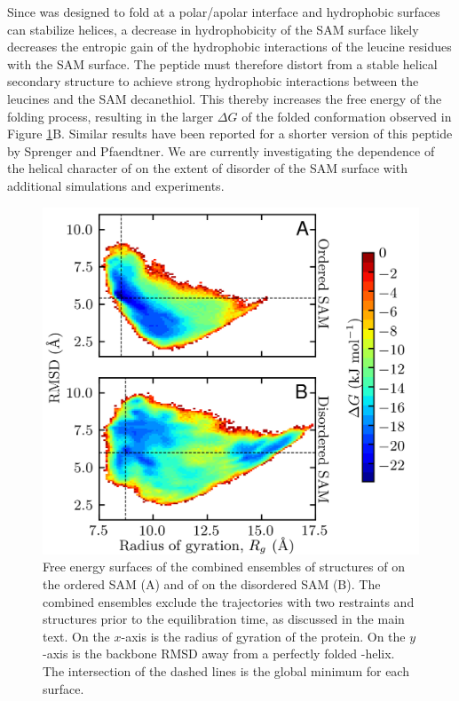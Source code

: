 Since \pep{} was designed to fold at a polar/apolar interface\cite{DeGrado1985} and hydrophobic surfaces can stabilize helices\cite{Levine2016}, a decrease in hydrophobicity of the SAM surface likely decreases the entropic gain of the hydrophobic interactions of the leucine residues with the SAM surface. 
The peptide must therefore distort from a stable helical secondary structure to achieve strong hydrophobic interactions between the leucines and the SAM decanethiol. 
This thereby increases the free energy of the folding process, resulting in the larger $\Delta G$ of the folded conformation observed in Figure \ref{fig:helix-free_order}B. 
Similar results have been reported for a shorter version of this peptide by Sprenger and Pfaendtner\cite{Sprenger2016}. 
We are currently investigating the dependence of the helical character of \pep{} on the extent of disorder of the SAM surface with additional simulations and experiments.  

\begin{figure}
    \center
    \includegraphics[width=\single]{figures-helix/comparison_free_energy_plots.png}
    \caption[Comparison of the free energy surfaces of \pep{} on an ordered SAM and on a disordered SAM]{
        Free energy surfaces of the combined ensembles of structures of \pep{} on the ordered SAM (A) and of \pep{} on the disordered SAM (B). 
        The combined ensembles exclude the trajectories with two restraints and structures prior to the equilibration time, as discussed in the main text. 
        On the $x$-axis is the radius of gyration of the protein. 
        On the $y$-axis is the backbone RMSD away from a perfectly folded \textalpha{}-helix. 
        The intersection of the dashed lines is the global minimum for each surface. 
    }
    \label{fig:helix-free_order}
\end{figure}

